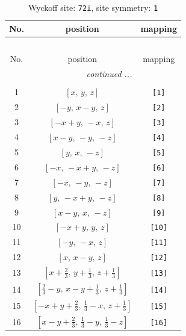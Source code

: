 \documentclass[fleqn,8pt]{jsarticle}
\begin{document}
\renewcommand{\arraystretch}{1.2}
\begin{longtable}{ccc}
\caption{Wyckoff site: {\tt 72i}, site symmetry: {\tt 1}}
 \\
 \hline \hline
No. & position & mapping \\ \hline \endfirsthead

\multicolumn{2}{l}{\tablename\ \thetable{}} \\
 \hline \hline
No. & position & mapping \\ \hline \endhead

 \hline \hline
\multicolumn{2}{r}{\footnotesize\it continued ...} \\ \endfoot

 \hline \hline
\multicolumn{2}{r}{} \\ \endlastfoot

1 & $\left[ x,\, y,\, z \right]$ & {\tt [1]} \\ \hline
2 & $\left[ - y,\, x - y,\, z \right]$ & {\tt [2]} \\ \hline
3 & $\left[ - x + y,\, - x,\, z \right]$ & {\tt [3]} \\ \hline
4 & $\left[ x - y,\, - y,\, - z \right]$ & {\tt [4]} \\ \hline
5 & $\left[ y,\, x,\, - z \right]$ & {\tt [5]} \\ \hline
6 & $\left[ - x,\, - x + y,\, - z \right]$ & {\tt [6]} \\ \hline
7 & $\left[ - x,\, - y,\, - z \right]$ & {\tt [7]} \\ \hline
8 & $\left[ y,\, - x + y,\, - z \right]$ & {\tt [8]} \\ \hline
9 & $\left[ x - y,\, x,\, - z \right]$ & {\tt [9]} \\ \hline
10 & $\left[ - x + y,\, y,\, z \right]$ & {\tt [10]} \\ \hline
11 & $\left[ - y,\, - x,\, z \right]$ & {\tt [11]} \\ \hline
12 & $\left[ x,\, x - y,\, z \right]$ & {\tt [12]} \\ \hline
13 & $\left[ x + \frac{2}{3},\, y + \frac{1}{3},\, z + \frac{1}{3} \right]$ & {\tt [13]} \\ \hline
14 & $\left[ \frac{2}{3} - y,\, x - y + \frac{1}{3},\, z + \frac{1}{3} \right]$ & {\tt [14]} \\ \hline
15 & $\left[ - x + y + \frac{2}{3},\, \frac{1}{3} - x,\, z + \frac{1}{3} \right]$ & {\tt [15]} \\ \hline
16 & $\left[ x - y + \frac{2}{3},\, \frac{1}{3} - y,\, \frac{1}{3} - z \right]$ & {\tt [16]} \\ \hline

\end{longtable}
\end{document}
